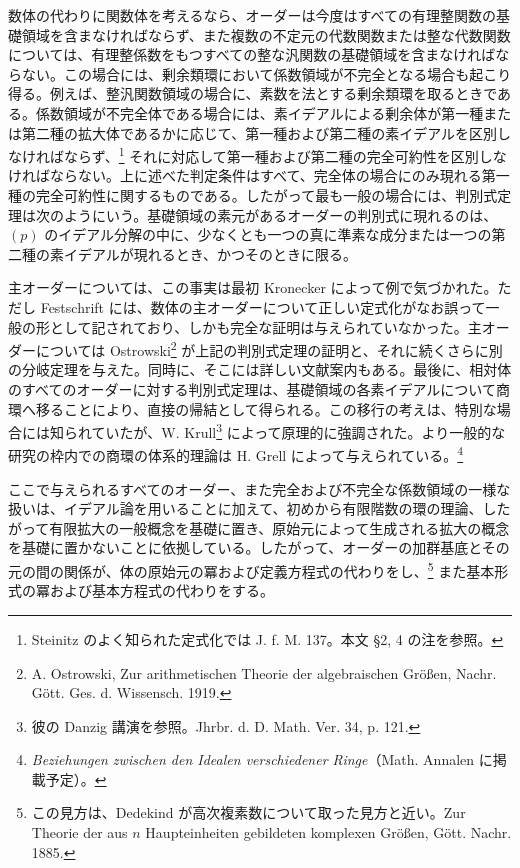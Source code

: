 \documentclass[11pt]{article}
\begin{document}
数体の代わりに関数体を考えるなら、オーダーは今度はすべての有理整関数の基礎領域を含まなければならず、また複数の不定元の代数関数または整な代数関数については、有理整係数をもつすべての整な汎関数の基礎領域を含まなければならない。この場合には、剰余類環において係数領域が不完全となる場合も起こり得る。例えば、整汎関数領域の場合に、素数を法とする剰余類環を取るときである。係数領域が不完全体である場合には、素イデアルによる剰余体が第一種または第二種の拡大体であるかに応じて、第一種および第二種の素イデアルを区別しなければならず、\footnote{Steinitz のよく知られた定式化では J. f. M. 137。本文 \S 2, 4 の注を参照。} それに対応して第一種および第二種の完全可約性を区別しなければならない。上に述べた判定条件はすべて、完全体の場合にのみ現れる第一種の完全可約性に関するものである。したがって最も一般の場合には、判別式定理は次のようにいう。基礎領域の素元があるオーダーの判別式に現れるのは、$(p)$ のイデアル分解の中に、少なくとも一つの真に準素な成分または一つの第二種の素イデアルが現れるとき、かつそのときに限る。

主オーダーについては、この事実は最初 Kronecker によって例で気づかれた。ただし Festschrift には、数体の主オーダーについて正しい定式化がなお誤って一般の形として記されており、しかも完全な証明は与えられていなかった。主オーダーについては Ostrowski\footnote{A. Ostrowski, Zur arithmetischen Theorie der algebraischen Größen, Nachr. Gött. Ges. d. Wissensch. 1919.} が上記の判別式定理の証明と、それに続くさらに別の分岐定理を与えた。同時に、そこには詳しい文献案内もある。最後に、相対体のすべてのオーダーに対する判別式定理は、基礎領域の各素イデアルについて商環へ移ることにより、直接の帰結として得られる。この移行の考えは、特別な場合には知られていたが、W. Krull\footnote{彼の Danzig 講演を参照。Jhrbr. d. D. Math. Ver. 34, p. 121.} によって原理的に強調された。より一般的な研究の枠内での商環の体系的理論は H. Grell によって与えられている。\footnote{\emph{Beziehungen zwischen den Idealen verschiedener Ringe}（Math. Annalen に掲載予定）。}

ここで与えられるすべてのオーダー、また完全および不完全な係数領域の一様な扱いは、イデアル論を用いることに加えて、初めから有限階数の環の理論、したがって有限拡大の一般概念を基礎に置き、原始元によって生成される拡大の概念を基礎に置かないことに依拠している。したがって、オーダーの加群基底とその元の間の関係が、体の原始元の冪および定義方程式の代わりをし、\footnote{この見方は、Dedekind が高次複素数について取った見方と近い。Zur Theorie der aus $n$ Haupteinheiten gebildeten komplexen Größen, Gött. Nachr. 1885.} また基本形式の冪および基本方程式の代わりをする。
\end{document}
